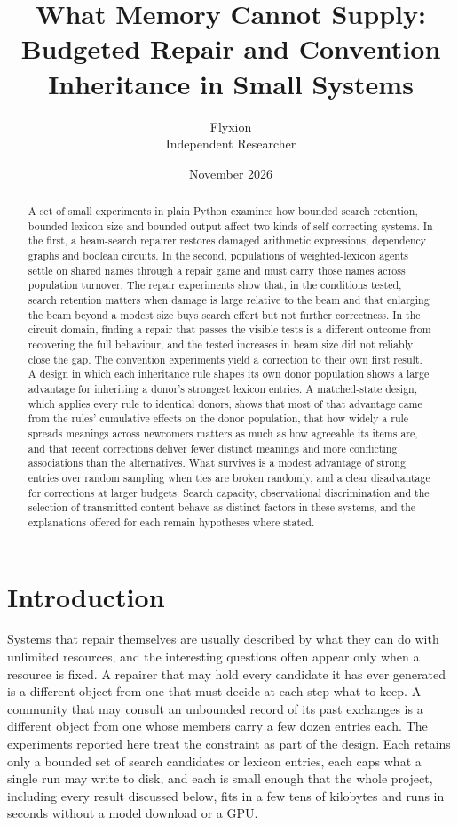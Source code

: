 \documentclass[11pt]{article}
\title{What Memory Cannot Supply: Budgeted Repair and Convention Inheritance in Small Systems}
\author{Flyxion\\Independent Researcher}
\date{November 2026}
\begin{document}
\maketitle

\begin{abstract}
\noindent A set of small experiments in plain Python examines how bounded search retention, bounded lexicon size and bounded output affect two kinds of self-correcting systems. In the first, a beam-search repairer restores damaged arithmetic expressions, dependency graphs and boolean circuits. In the second, populations of weighted-lexicon agents settle on shared names through a repair game and must carry those names across population turnover. The repair experiments show that, in the conditions tested, search retention matters when damage is large relative to the beam and that enlarging the beam beyond a modest size buys search effort but not further correctness. In the circuit domain, finding a repair that passes the visible tests is a different outcome from recovering the full behaviour, and the tested increases in beam size did not reliably close the gap. The convention experiments yield a correction to their own first result. A design in which each inheritance rule shapes its own donor population shows a large advantage for inheriting a donor's strongest lexicon entries. A matched-state design, which applies every rule to identical donors, shows that most of that advantage came from the rules' cumulative effects on the donor population, that how widely a rule spreads meanings across newcomers matters as much as how agreeable its items are, and that recent corrections deliver fewer distinct meanings and more conflicting associations than the alternatives. What survives is a modest advantage of strong entries over random sampling when ties are broken randomly, and a clear disadvantage for corrections at larger budgets. Search capacity, observational discrimination and the selection of transmitted content behave as distinct factors in these systems, and the explanations offered for each remain hypotheses where stated.
\end{abstract}

\section{Introduction}

Systems that repair themselves are usually described by what they can do with unlimited resources, and the interesting questions often appear only when a resource is fixed. A repairer that may hold every candidate it has ever generated is a different object from one that must decide at each step what to keep. A community that may consult an unbounded record of its past exchanges is a different object from one whose members carry a few dozen entries each. The experiments reported here treat the constraint as part of the design. Each retains only a bounded set of search candidates or lexicon entries, each caps what a single run may write to disk, and each is small enough that the whole project, including every result discussed below, fits in a few tens of kilobytes and runs in seconds without a model download or a GPU.
\end{document}
